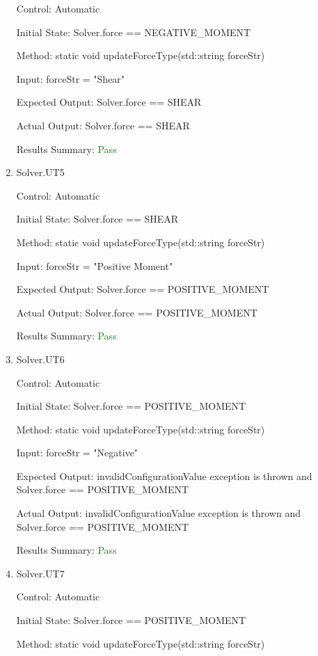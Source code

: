 \documentclass[12pt, titlepage]{article}
\begin{document}
\begin{enumerate}
    Control: Automatic

    Initial State: Solver.force == NEGATIVE\_MOMENT
    
    Method: static void updateForceType(std::string forceStr)
    
    Input: forceStr = "Shear"
    
    Expected Output: Solver.force == SHEAR

    Actual Output: Solver.force == SHEAR

    Results Summary: \textcolor{green} {Pass}

    \item{Solver.UT5\\}
    
    Control: Automatic

    Initial State: Solver.force == SHEAR
    
    Method: static void updateForceType(std::string forceStr)
    
    Input: forceStr = "Positive Moment"
    
    Expected Output: Solver.force == POSITIVE\_MOMENT

    Actual Output: Solver.force == POSITIVE\_MOMENT

    Results Summary: \textcolor{green} {Pass}

    \item{Solver.UT6\\}
    
    Control: Automatic

    Initial State: Solver.force == POSITIVE\_MOMENT
    
    Method: static void updateForceType(std::string forceStr)
    
    Input: forceStr = "Negative"
    
    Expected Output: invalidConfigurationValue exception is thrown and Solver.force == POSITIVE\_MOMENT

    Actual Output: invalidConfigurationValue exception is thrown and Solver.force == POSITIVE\_MOMENT

    Results Summary: \textcolor{green} {Pass}

    \item{Solver.UT7\\}
    
    Control: Automatic

    Initial State: Solver.force == POSITIVE\_MOMENT
    
    Method: static void updateForceType(std::string forceStr)
    

\end{enumerate}
\end{document}

